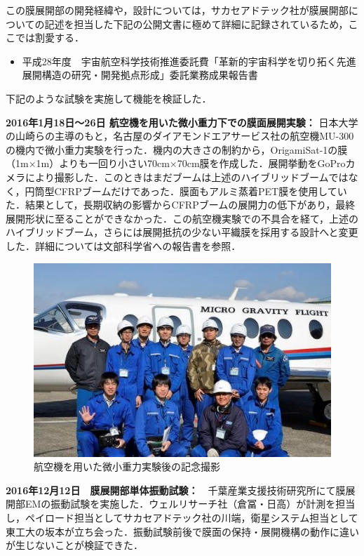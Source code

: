 この膜展開部の開発経緯や，設計については，サカセアドテック社が膜展開部についての記述を担当した下記の公開文書に極めて詳細に記録されているため，ここでは割愛する．
\begin{itemize}
	\item 平成28年度　宇宙航空科学技術推進委託費「革新的宇宙科学を切り拓く先進展開構造の研究・開発拠点形成」委託業務成果報告書
\end{itemize}

下記のような試験を実施して機能を検証した．\vspace{2mm}

\noindent \textbf{2016年1月18日～26日 航空機を用いた微小重力下での膜面展開実験：} 日本大学の山崎らの主導のもと，名古屋のダイアモンドエアサービス社の航空機MU-300の機内で微小重力実験を行った．機内の大きさの制約から，OrigamiSat-1の膜（1m×1m）よりも一回り小さい70cm×70cm膜を作成した．展開挙動をGoProカメラにより撮影した．このときはまだブームは上述のハイブリッドブームではなく，円筒型CFRPブームだけであった．膜面もアルミ蒸着PET膜を使用していた．結果として，長期収納の影響からCFRPブームの展開力の低下があり，最終展開形状に至ることができなかった．この航空機実験での不具合を経て，上述のハイブリッドブーム，さらには展開抵抗の少ない平織膜を採用する設計へと変更した．詳細については文部科学省への報告書を参照．
\begin{figure}[H]
	\centering
	\includegraphics[width=.6\textwidth]{03/fig/3-9-3-1-13.jpg}
	\caption{航空機を用いた微小重力実験後の記念撮影}
	\label{fig3-9-3-1-13}
\end{figure}
	
\noindent \textbf{2016年12月12日　膜展開部単体振動試験：}　千葉産業支援技術研究所にて膜展開部EMの振動試験を実施した．ウェルリサーチ社（倉冨・日高）が計測を担当し，ペイロード担当としてサカセアドテック社の川端，衛星システム担当として東工大の坂本が立ち会った．振動試験前後で膜面の保持・展開機構の動作に違いが生じないことが検証できた．\vspace{2mm}

